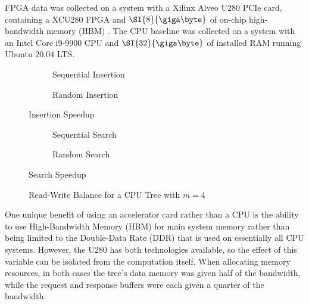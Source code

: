 
FPGA data was collected on a system with a Xilinx Alveo U280 PCIe card,
containing a XCU280 FPGA and $\SI{8}{\giga\byte}$ of on-chip high-bandwidth
memory (HBM) \autocite{u280}. The CPU baseline was collected on a system with an
Intel Core i9-9900 CPU and $\SI{32}{\giga\byte}$ of installed RAM running Ubuntu
20.04 LTS.




\begin{figure}[H]
	\centering
	\begin{subfigure}{7.5cm}
		\centering
		
		\caption{Sequential Insertion}
		\label{fig:fpga-sequential-insert}
	\end{subfigure}
	\begin{subfigure}{7.5cm}
		\centering
		
		\caption{Random Insertion}
		\label{fig:fpga-random-insert}
	\end{subfigure}
	\caption{Insertion Speedup}
	\label{fig:insert-speedup}
\end{figure}

\begin{figure}[H]
	\centering
	\begin{subfigure}{7.5cm}
		\centering
		
		\caption{Sequential Search}
		\label{fig:fpga-sequential-search}
	\end{subfigure}
	\begin{subfigure}{7.5cm}
		\centering
		
		\caption{Random Search}
		\label{fig:fpga-random-search}
	\end{subfigure}
	\caption{Search Speedup}
	\label{fig:search-speedup}
\end{figure}



\begin{figure}[H]
	\centering
	
	\caption{Read-Write Balance for a CPU Tree with $m=4$}
	\label{fig:rw-balance}
\end{figure}



One unique benefit of using an accelerator card rather than a CPU is the ability
to use High-Bandwidth Memory (HBM) for main system memory rather than being
limited to the Double-Data Rate (DDR) that is used on essentially all CPU
systems. However, the U280 has both technologies available, so the effect of
this variable can be isolated from the computation itself. When allocating
memory resources, in both cases the tree's data memory was given half of the
bandwidth, while the request and response buffers were each given a quarter of
the bandwidth.

